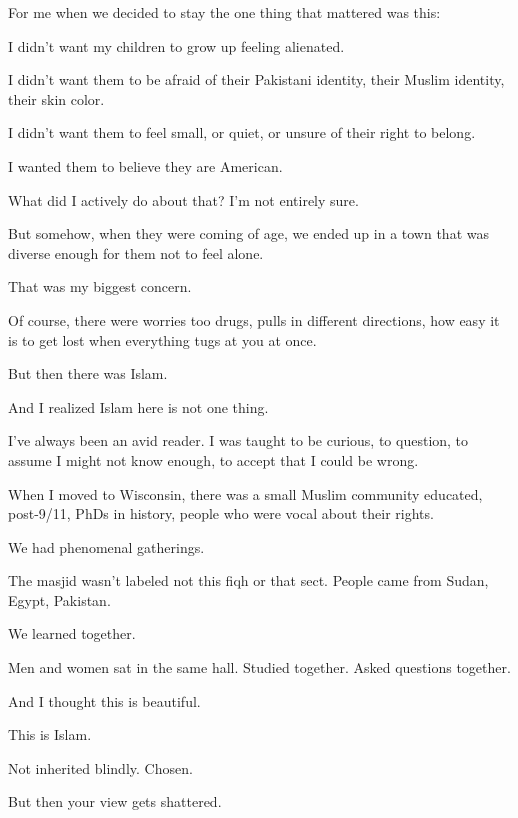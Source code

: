 \begin{FoundPoem}
For me
when we decided to stay
the one thing that mattered was this:

    I didn’t want my children
    to grow up
    feeling alienated.
    
    I didn’t want them
    to be afraid
    of their Pakistani identity,
    their Muslim identity,
    their skin color.
    
    I didn’t want them
    to feel small,
    or quiet,
    or unsure of their right
    to belong.
    
    I wanted them to believe
    they are American.
    
    What did I actively do about that?
    I’m not entirely sure.
    
    But somehow,
    when they were coming of age,
    we ended up in a town
    that was diverse enough
    for them not to feel alone.
    
    That was my biggest concern.
    
    Of course,
    there were worries too
    drugs,
    pulls in different directions,
    how easy it is to get lost
    when everything tugs at you at once.
    
    But then there was Islam.
    
    And I realized
    Islam here
    is not one thing.
    
    I’ve always been an avid reader.
    I was taught to be curious,
    to question,
    to assume I might not know enough,
    to accept that I could be wrong.
    
    When I moved to Wisconsin,
    there was a small Muslim community
    educated,
    post-9/11,
    PhDs in history,
    people who were vocal about their rights.
    
    We had phenomenal gatherings.
    
    The masjid wasn’t labeled
    not this fiqh or that sect.
    People came
    from Sudan,
    Egypt,
    Pakistan.
    
    We learned together.
    
    Men and women
    sat in the same hall.
    Studied together.
    Asked questions together.
    
    And I thought
    this is beautiful.
    
    This is Islam.
    
    Not inherited blindly.
    Chosen.
    
    But then
    your view gets shattered.
    

\end{FoundPoem}
